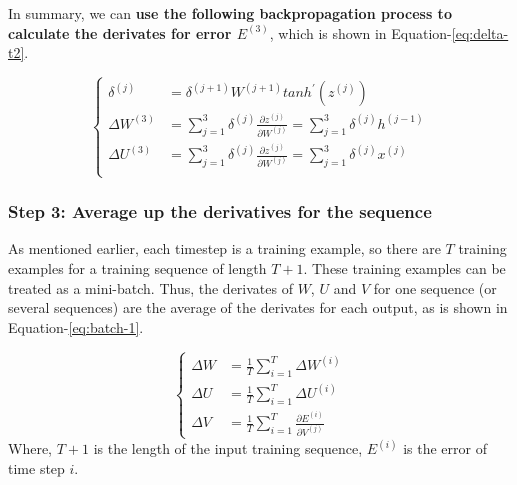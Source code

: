 \documentclass[english]{article}
\begin{document}
 
 In summary,  we can \textbf{use the following backpropagation process to calculate the derivates for error $E^{(3)}$}, which is shown in 
 Equation-\ref{eq:delta-t2}.
 
 \begin{equation}\label{eq:delta-t2}\begin{cases}
 \delta^{(j)} &= \delta^{(j+1)} W^{(j+1)} tanh^{\prime}(z^{(j)}) \\
\Delta W^{(3)} &= {\sum\limits_{j=1}^3}\delta^{(j)}\frac{\partial z^{(j)}}{\partial W^{(j)}} = {\sum\limits_{j=1}^3}\delta^{(j)}h^{(j-1)}\\
\Delta U^{(3)} &= {\sum\limits_{j=1}^3}\delta^{(j)}\frac{\partial z^{(j)}}{\partial W^{(j)}} = {\sum\limits_{j=1}^3}\delta^{(j)}x^{(j)} \\
\end{cases}\end{equation}


\subsubsection{Step 3: Average up the derivatives for the sequence}
As mentioned earlier, each timestep is a training example, so there are $T$ training examples for a training sequence of length $T+1$.
These training examples can be treated as a mini-batch.  Thus, the derivates of $W$, $U$ and $V$ for one sequence (or several sequences) are the
average of the derivates for each output, as is shown in Equation-\ref{eq:batch-1}.
 
 \begin{equation}\label{eq:batch-1}\begin{cases}
\Delta W &=  \frac{1}{T}\sum\limits_{i=1}^T\Delta W^{(i)}\\
\Delta U &=  \frac{1}{T}\sum\limits_{i=1}^T\Delta U^{(i)}\\
\Delta V &=  \frac{1}{T}\sum\limits_{i=1}^T\frac{\partial E^{(i)}}{\partial V^{(j)}}
\end{cases}\end{equation}
Where, $T+1$ is the length of the input training sequence, $E^{(i)}$ is the error of time step $i$.
\end{document}
